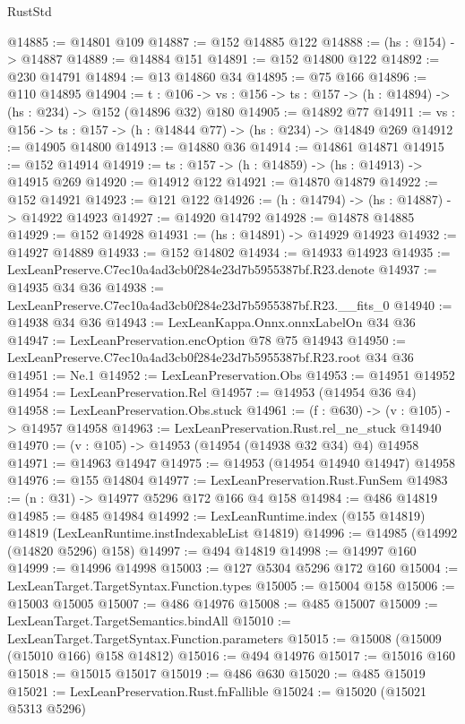 \begin{lexlean}{RustStd}
\begin{coremodule}
@14885 := @14801 @109
@14887 := @152 @14885 @122
@14888 := (hs : @154) -> @14887
@14889 := @14884 @151
@14891 := @152 @14800 @122
@14892 := @230 @14791
@14894 := @13 @14860 @34
@14895 := @75 @166
@14896 := @110 @14895
@14904 := {t : @106} ->
  {vs : @156} -> {ts : @157} -> (h : @14894) -> (hs : @234) -> @152 (@14896 @32) @180
@14905 := @14892 @77
@14911 := {vs : @156} -> {ts : @157} -> (h : @14844 @77) -> (hs : @234) -> @14849 @269
@14912 := @14905 @14800
@14913 := @14880 @36
@14914 := @14861 @14871
@14915 := @152 @14914
@14919 := {ts : @157} -> (h : @14859) -> (hs : @14913) -> @14915 @269
@14920 := @14912 @122
@14921 := @14870 @14879
@14922 := @152 @14921
@14923 := @121 @122
@14926 := (h : @14794) -> (hs : @14887) -> @14922 @14923
@14927 := @14920 @14792
@14928 := @14878 @14885
@14929 := @152 @14928
@14931 := (hs : @14891) -> @14929 @14923
@14932 := @14927 @14889
@14933 := @152 @14802
@14934 := @14933 @14923
@14935 := LexLeanPreserve.C7ec10a4ad3cb0f284e23d7b5955387bf.R23.denote
@14937 := @14935 @34 @36
@14938 := LexLeanPreserve.C7ec10a4ad3cb0f284e23d7b5955387bf.R23.__fits_0
@14940 := @14938 @34 @36
@14943 := LexLeanKappa.Onnx.onnxLabelOn @34 @36
@14947 := LexLeanPreservation.encOption @78 @75 @14943
@14950 := LexLeanPreserve.C7ec10a4ad3cb0f284e23d7b5955387bf.R23.root @34 @36
@14951 := Ne.{1}
@14952 := LexLeanPreservation.Obs
@14953 := @14951 @14952
@14954 := LexLeanPreservation.Rel
@14957 := @14953 (@14954 @36 @4)
@14958 := LexLeanPreservation.Obs.stuck
@14961 := (f : @630) -> (v : @105) -> @14957 @14958
@14963 := LexLeanPreservation.Rust.rel_ne_stuck @14940
@14970 := (v : @105) -> @14953 (@14954 (@14938 @32 @34) @4) @14958
@14971 := @14963 @14947
@14975 := @14953 (@14954 @14940 @14947) @14958
@14976 := @155 @14804
@14977 := LexLeanPreservation.Rust.FunSem
@14983 := (n : @31) -> @14977 @5296 @172 @166 @4 @158
@14984 := @486 @14819
@14985 := @485 @14984
@14992 := LexLeanRuntime.index (@155 @14819) @14819 (LexLeanRuntime.instIndexableList @14819)
@14996 := @14985 (@14992 (@14820 @5296) @158)
@14997 := @494 @14819
@14998 := @14997 @160
@14999 := @14996 @14998
@15003 := @127 @5304 @5296 @172 @160
@15004 := LexLeanTarget.TargetSyntax.Function.types
@15005 := @15004 @158
@15006 := @15003 @15005
@15007 := @486 @14976
@15008 := @485 @15007
@15009 := LexLeanTarget.TargetSemantics.bindAll
@15010 := LexLeanTarget.TargetSyntax.Function.parameters
@15015 := @15008 (@15009 (@15010 @166) @158 @14812)
@15016 := @494 @14976
@15017 := @15016 @160
@15018 := @15015 @15017
@15019 := @486 @630
@15020 := @485 @15019
@15021 := LexLeanPreservation.Rust.fnFallible
@15024 := @15020 (@15021 @5313 @5296)

\end{coremodule}
\end{lexlean}
